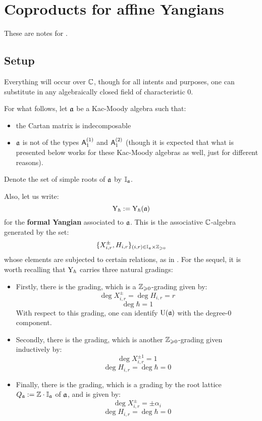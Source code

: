 \section{Coproducts for affine Yangians}
    These are notes for \cite{guay_nakajima_wendlandt_affine_yangian_coproduct}.

    \subsection{Setup}
        Everything will occur over $\mathbb{C}$, though for all intents and purposes, one can substitute in any algebraically closed field of characteristic $0$.
    
        For what follows, let $\mathfrak{a}$ be a Kac-Moody algebra such that:
        \begin{itemize}
            \item the Cartan matrix is indecomposable
            \item $\mathfrak{a}$ is not of the types $\mathsf{A}_1^{(1)}$ and $\mathsf{A}_1^{(2)}$ (though it is expected that what is presented below works for these Kac-Moody algebras as well, just for different reasons).
        \end{itemize}
        Denote the set of simple roots of $\mathfrak{a}$ by $\mathbb{I}_{\mathfrak{a}}$.
        
        Also, let us write:
            $$\mathrm{Y}_{\hbar} := \mathrm{Y}_{\hbar}(\mathfrak{a})$$
        for the \textbf{formal Yangian} associated to $\mathfrak{a}$. This is the associative $\mathbb{C}$-algebra generated by the set:
            $$\{ X_{i, r}^{\pm}, H_{i, r} \}_{(i, r) \in \simpleroots_{\a} \x \Z_{\geq 0}}$$
        whose elements are subjected to certain relations, as in \cite[Definition 2.1]{guay_nakajima_wendlandt_affine_yangian_coproduct}. For the sequel, it is worth recalling that $\mathrm{Y}_{\hbar}$ carries three natural gradings:
        \begin{itemize}
            \item Firstly, there is the  grading, which is a $\mathbb{Z}_{\geqslant 0}$-grading given by:
                $$\deg X_{i, r}^{\pm} = \deg H_{i, r} = r$$
                $$\deg \hbar = 1$$
            With respect to this grading, one can identify $\mathrm{U}(\mathfrak{a})$ with the degree-$0$ component.
            \item Secondly, there is the  grading, which is another $\mathbb{Z}_{\geqslant 0}$-grading given inductively by:
                $$\deg X_{i, r}^{\pm 1} = 1$$
                $$\deg H_{i, r} = \deg \hbar = 0$$
            \item Finally, there is the  grading, which is a grading by the root lattice $Q_{\mathfrak{a}} := \mathbb{Z} \cdot \mathbb{I}_{\mathfrak{a}}$ of $\mathfrak{a}$, and is given by:
                $$\deg X_{i, r}^{\pm} = \pm\alpha_i$$
                $$\deg H_{i, r} = \deg \hbar = 0$$
        \end{itemize}

